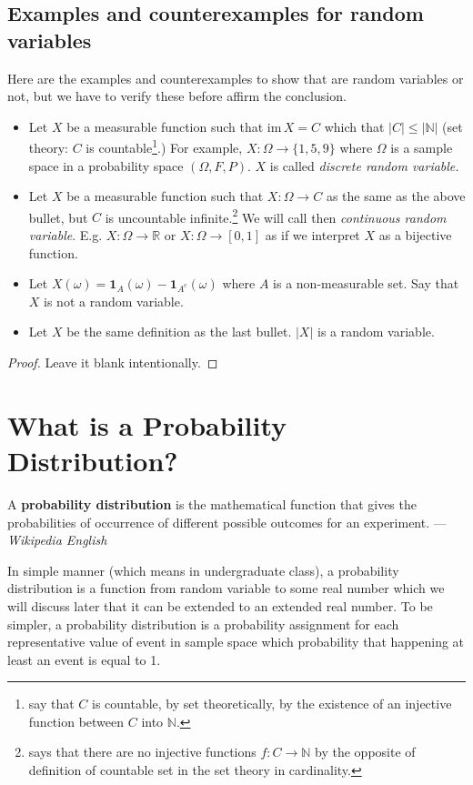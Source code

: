 \documentclass[12pt, a4paper]{report}
\begin{document}
    \subsection{Examples and counterexamples for random variables}
    Here are the examples and counterexamples to show that are random variables or not, but we have to verify these before affirm the conclusion.
    \begin{itemize}
        \item Let $X$ be a measurable function such that $\mathrm{im}\,X = C$ which that $|C| \leq |\mathbb{N}|$ (set theory: $C$ is countable\footnote{say that $C$ is countable, by set theoretically, by the existence of an injective function between $C$ into $\mathbb{N}$.}.) For example, $X: \Omega \rightarrow \{1,5,9\}$ where $\Omega$ is a sample space in a probability space $(\Omega, F, P)$. $X$ is called \emph{discrete random variable.}
        \item Let $X$ be a measurable function such that $X: \Omega \to C$ as the same as the above bullet, but $C$ is uncountable infinite.\footnote{says that there are no injective functions $f: C \rightarrow \mathbb{N}$ by the opposite of definition of countable set in the set theory in cardinality.} We will call then \emph{continuous random variable}. E.g. $X: \Omega \to \mathbb{R}$ or $X: \Omega \to [0,1]$ as if we interpret $X$ as a bijective function.
        \item Let $X(\omega) = \mathbf{1}_A(\omega) - \mathbf{1}_{A^c}(\omega)$ where $A$ is a non-measurable set. Say that $X$ is not a random variable.
        \item Let $X$ be the same definition as the last bullet. $|X|$ is a random variable.
    \end{itemize}
    \begin{proof}
        Leave it blank intentionally.
    \end{proof}

    \section{What is a Probability Distribution?}
    \begin{displayquote}
        A \textbf{probability distribution} is the mathematical function that gives the probabilities of occurrence of different possible outcomes for an experiment. — \emph{Wikipedia English}
    \end{displayquote}

    In simple manner (which means in undergraduate class), a probability distribution is a function from random variable to some real number which we will discuss later that it can be extended to an extended real number. To be simpler, a probability distribution is a probability assignment for each representative value of event in sample space which probability that happening at least an event is equal to 1.
\end{document}
